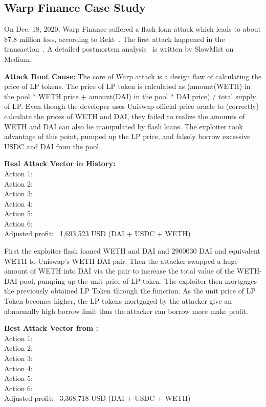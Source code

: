 \subsection{Warp Finance Case Study}
\label{subsec:Warp}


On Dec. 18, 2020, Warp Finance suffered a flash loan attack which leads to about \$7.8 million loss, 
according to Rekt~\cite{Rekt}. The first attack happened in 
the transaction~\cite{Warp}. 
A detailed postmortem analysis~\cite{WarpFiAnalysis} is written by SlowMist on Medium. 


\noindent \textbf{Attack Root Cause:}
The core of Warp attack is a design flaw of calculating 
the price of LP tokens. The price of LP token is calculated as (amount(WETH) in the pool * WETH price + amount(DAI) in the pool * DAI price) / total supply of LP. Even though the developer uses Uniswap official price oracle to (correctly) calculate the prices of WETH and DAI, they failed to realize the amounts of WETH and DAI can also be manipulated by flash loans. The exploiter took advantage of this point, pumped up the LP price, and falsely borrow excessive USDC and DAI from the pool.


\noindent \textbf{Real Attack Vector in History:}
\\
Action 1:  
\\ 
Action 2:  
\\ 
Action 3:  
\\ 
Action 4:  
\\
Action 5:  
\\
Action 6:  
\\ 
Adjusted profit: ~1,693,523 USD (DAI + USDC + WETH)


First the exploiter flash loaned WETH and DAI and  2900030 DAI and equivalent WETH to Uniswap's WETH-DAI pair. Then the attacker swapped a huge amount of WETH into DAI via the pair to increase the total value of the WETH-DAI pool, pumping up the unit price of LP token. The exploiter then mortgages the previously obtained LP Token through the  function. As the unit price of LP Token becomes higher, the LP tokens mortgaged by the attacker give an abnormally high borrow limit thus the attacker can borrow more make profit.


\noindent \textbf{Best Attack Vector from {\name}:}
\\
Action 1:  
\\
Action 2:  
\\
Action 3:  
\\ 
Action 4:  
\\
Action 5:  
\\
Action 6:  
\\ 
Adjusted profit: ~3,368,718 USD (DAI + USDC + WETH)


